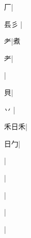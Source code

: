 \begin{multicols}{2}
{{厂}|{}\par
{\cjk{}镸彡{\cnxJzr{}}}|{}\par
{\cjk{}{\cnsym{}　}{\cnsym{}　}耂}|{\cjk{}煮}\par
{耂}|{}\par
{}|{}\par
{\cjk{}{\cnsym{}　}{\cnsym{}　}貝}|{}\par
{\cjk{}{\cnsym{}　}丷{\cnjzr{}}}|{}\par
{\cjk{}禾日禾}|{}\par
{\cjk{}{\cnsym{}　}日勹}|{}\par
{\cjk{}{\cnsym{}　}{\cnsym{}　}{\cnsym{}　}}|{}\par
{\cjk{}{\cnsym{}　}{\cnsym{}　}{\cnsym{}　}}|{}\par
{\cjk{}{\cnsym{}　}{\cnsym{}　}{\cnsym{}　}}|{}\par
{\cjk{}{\cnsym{}　}{\cnsym{}　}{\cnsym{}　}}|{}\par
{\cjk{}{\cnsym{}　}{\cnsym{}　}{\cnsym{}　}}|{}\par
}
\end{multicols}
